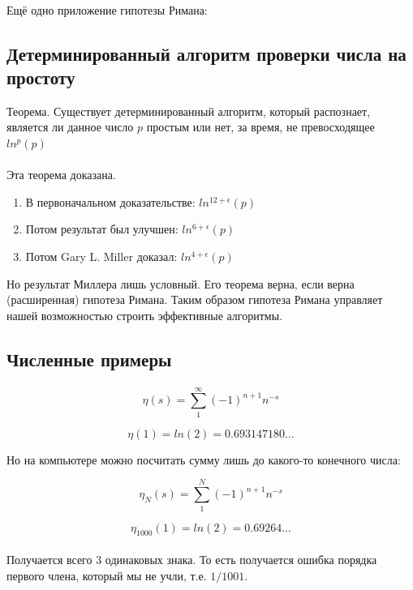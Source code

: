 \documentclass{article}
\begin{document}
\paragraph{}
Ещё одно приложение гипотезы Римана:

\subsection{Детерминированный алгоритм проверки числа на простоту}

Теорема. Существует детерминированный алгоритм, который распознает,
является ли данное число $p$ простым или нет, за время, не превосходящее $ln^p(p)$

\paragraph{}
Эта теорема доказана.

\begin{enumerate}
    \item В первоначальном доказательстве: $ ln^{12 + \epsilon}(p) $
    \item Потом результат был улучшен: $ ln^{6 + \epsilon}(p) $
    \item Потом Gary L. Miller доказал: $ ln^{4 + \epsilon}(p) $
\end{enumerate}

Но результат Миллера лишь условный. Его теорема верна, если верна (расширенная)
гипотеза Римана. Таким образом гипотеза Римана управляет нашей возможностью строить
эффективные алгоритмы.

\subsection{Численные примеры}

\paragraph{}
\[ \eta (s) = \sum_{1}^{\infty} (-1)^{n+1} n^{-s} \]

$$ \eta(1) = ln(2) = 0.693147180... $$

Но на компьютере можно посчитать сумму лишь до какого-то конечного числа:

$$
    \eta_N (s) = \sum_{1}^{N} (-1)^{n+1} n^{-s}
$$

$$ \eta_{1000}(1) = ln(2) = 0.69264... $$

\paragraph{}
Получается всего 3 одинаковых знака. То есть получается ошибка порядка первого члена,
который мы не учли, т.е. $1/1001$.
\end{document}
